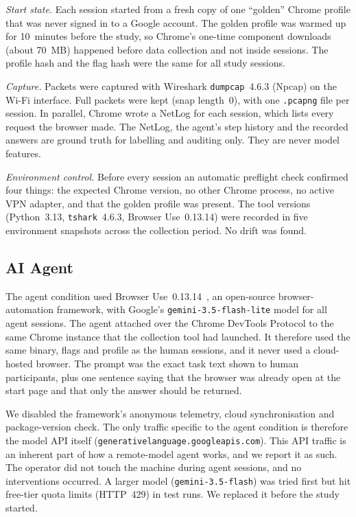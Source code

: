\textit{Start state.} Each session started from a fresh copy of one ``golden'' Chrome profile that was never signed in to a Google account. The golden profile was warmed up for 10~minutes before the study, so Chrome's one-time component downloads (about 70~MB) happened before data collection and not inside sessions. The profile hash and the flag hash were the same for all study sessions.

\textit{Capture.} Packets were captured with Wireshark \texttt{dumpcap}~4.6.3 (Npcap) on the Wi-Fi interface. Full packets were kept (snap length~0), with one \texttt{.pcapng} file per session. In parallel, Chrome wrote a NetLog for each session, which lists every request the browser made. The NetLog, the agent's step history and the recorded answers are ground truth for labelling and auditing only. They are never model features.

\textit{Environment control.} Before every session an automatic preflight check confirmed four things: the expected Chrome version, no other Chrome process, no active VPN adapter, and that the golden profile was present. The tool versions (Python~3.13, \texttt{tshark}~4.6.3, Browser Use~0.13.14) were recorded in five environment snapshots across the collection period. No drift was found.

\subsection{AI Agent}
\label{sec:method-agent}
The agent condition used Browser Use~0.13.14~\cite{browseruse}, an open-source browser-automation framework, with Google's \texttt{gemini-3.5-flash-lite} model for all agent sessions. The agent attached over the Chrome DevTools Protocol to the same Chrome instance that the collection tool had launched. It therefore used the same binary, flags and profile as the human sessions, and it never used a cloud-hosted browser. The prompt was the exact task text shown to human participants, plus one sentence saying that the browser was already open at the start page and that only the answer should be returned.

We disabled the framework's anonymous telemetry, cloud synchronisation and package-version check. The only traffic specific to the agent condition is therefore the model API itself (\texttt{generativelanguage.googleapis.com}). This API traffic is an inherent part of how a remote-model agent works, and we report it as such. The operator did not touch the machine during agent sessions, and no interventions occurred. A larger model (\texttt{gemini-3.5-flash}) was tried first but hit free-tier quota limits (HTTP~429) in test runs. We replaced it before the study started.

